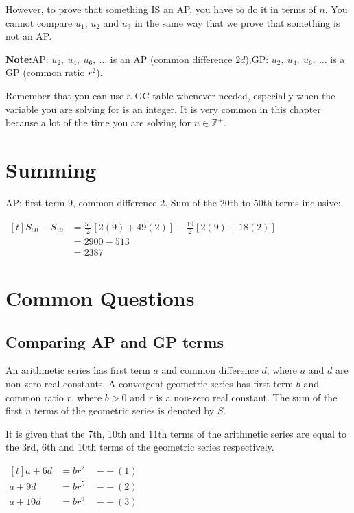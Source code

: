 \documentclass[a4paper,11pt,oneside]{book}
\providecommand{\cdisp}[1]{\par\noindent$\displaystyle\begin{aligned}[t]#1\end{aligned}$\par\smallskip}
\renewcommand{\cdisp}[1]{\par\noindent\hfill$\displaystyle\begin{aligned}[t]#1\end{aligned}$\hfill\null\par\smallskip}
\begin{document}
\smallskip
{\color{gray!70}However, to prove that something IS an AP, you have to do it in terms of $n$. You cannot compare $u_1$, $u_2$ and $u_3$ in the same way that we prove that something is not an AP.}\par
\textbf{Note:}\quad AP: $u_2,\ u_4,\ u_6,\ \dots$ is an AP (common difference $2d$),\qquad GP: $u_2,\ u_4,\ u_6,\ \dots$ is a GP (common ratio $r^{2}$).\par
\begin{info}[title=Important Note]
Remember that you can use a GC table whenever needed, especially when the variable you are solving for is an integer. It is very common in this chapter because a lot of the time you are solving for $n\in\mathbb{Z}^{+}$.
\end{info}
\section{Summing}
\exlab
AP: first term $9$, common difference $2$. Sum of the 20th to 50th terms inclusive:
\cdisp{S_{50}-S_{19}&=\frac{50}{2}\left[2(9)+49(2)\right]-\frac{19}{2}\left[2(9)+18(2)\right]\\&=2900-513\\&=2387}
\section{Common Questions}
\subsection{Comparing AP and GP terms}
\par
An arithmetic series has first term $a$ and common difference $d$, where $a$ and $d$ are non-zero real constants. A convergent geometric series has first term $b$ and common ratio $r$, where $b>0$ and $r$ is a non-zero real constant. The sum of the first $n$ terms of the geometric series is denoted by $S$.\par
It is given that the 7th, 10th and 11th terms of the arithmetic series are equal to the 3rd, 6th and 10th terms of the geometric series respectively.
\cdisp{a+6d&=br^{2}\quad--\ (1)\\a+9d&=br^{5}\quad--\ (2)\\a+10d&=br^{9}\quad--\ (3)}
\end{document}
